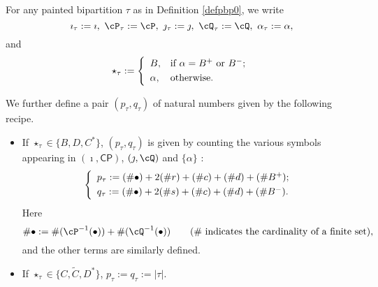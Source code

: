 \documentclass[12pt,a4paper]{amsart}
\def\abs#1{\left|{#1}\right|}
\newcommand{\CP}{{\mathcal {P}}}
\newcommand{\CQ}{{\mathcal {Q}}}
\numberwithin{equation}{section}
\theoremstyle{remark}
\newtheorem*{remark}{Remark}
\def\CP{\mathsf{CP}}
\def\CQ{\overline{\sfA}}%
\begin{document}

For any painted bipartition $\tau$ as in Definition \ref{defpbp0}, we write
\[
  \imath_\tau:=\imath,\ \cP_\tau:=\cP,\  \jmath_\tau:=\jmath,\  \cQ_\tau:=\cQ,\ \alpha_\tau:=\alpha,
\]
and
\[
  \star_\tau:= \left\{
     \begin{array}{ll}
         B, &\hbox{if $\alpha=B^+$ or $B^-$}; \smallskip\\
            \alpha, & \hbox{otherwise}.           \end{array}
   \right.
  \]

We further define a pair $(p_{\tau}, q_{\tau})$  of natural numbers given by the following recipe.
 \begin{itemize}
  \item
  If $\star_\tau\in \{B, D, C^*\}$, $(p_\tau, q_\tau)$ is given by counting  the various symbols appearing in $(\imath, \CP)$, $(\jmath, \cQ)$ and $\{\alpha\}$ :
  \begin{equation}\label{ptqt}
  \left\{
     \begin{array}{l}
    p_\tau :=( \# \bullet)+ 2 (\# r) +(\# c )+ (\# d) + (\# B^+);\smallskip\\
    q_\tau :=( \# \bullet)+ 2 (\# s) + (\# c) + (\# d) + (\# B^-).\\
    \end{array}
    \right.
\end{equation}
Here
\[
\#\bullet:=\#(\cP^{-1}(\bullet))+\#(\cQ^{-1}(\bullet))\qquad (\textrm{$\#$ indicates the cardinality of a finite set}),
\]
and the other terms are similarly defined.
\item
If $\star_\tau\in \{C, \widetilde C, D^*\}$,  $p_\tau:=q_\tau:=\abs{\tau}$.
\end{itemize}
\smallskip
\end{document}
